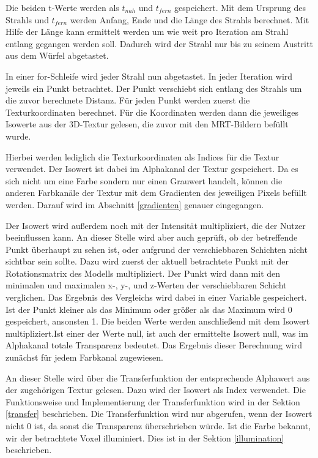 Die beiden t-Werte werden als $t_{nah}$ und $t_{fern}$ gespeichert.
Mit dem Ursprung des Strahls und $t_{fern}$ werden Anfang, Ende und die Länge des Strahls berechnet. Mit Hilfe der Länge kann ermittelt werden um wie weit pro Iteration am Strahl entlang gegangen werden soll. Dadurch wird der Strahl nur bis zu seinem Austritt aus dem Würfel abgetastet. 

In einer for-Schleife wird jeder Strahl nun abgetastet. In jeder Iteration wird jeweils ein Punkt betrachtet. Der Punkt verschiebt sich entlang des Strahls um die zuvor berechnete Distanz.
Für jeden Punkt werden zuerst die Texturkoordinaten berechnet.
Für die Koordinaten werden dann die jeweiliges Isowerte aus der 3D-Textur gelesen, die zuvor mit den MRT-Bildern befüllt wurde.

Hierbei werden lediglich die Texturkoordinaten als Indices für die Textur verwendet. 
Der Isowert ist dabei im Alphakanal der Textur gespeichert. Da es sich nicht um eine Farbe sondern nur einen Grauwert handelt, können die anderen Farbkanäle der Textur mit dem Gradienten des jeweiligen Pixels befüllt werden. Darauf wird im Abschnitt \ref{gradienten} genauer eingegangen.

Der Isowert wird außerdem noch mit der Intensität multipliziert, die der Nutzer beeinflussen kann.
An dieser Stelle wird aber auch geprüft, ob der betreffende Punkt überhaupt zu sehen ist, oder aufgrund der verschiebbaren Schichten nicht sichtbar sein sollte. 
Dazu wird zuerst der aktuell betrachtete Punkt mit der Rotationsmatrix des Modells multipliziert.
Der Punkt wird dann mit den minimalen und maximalen x-, y-, und z-Werten der verschiebbaren Schicht verglichen. Das Ergebnis des Vergleichs wird dabei in einer Variable gespeichert. Ist der Punkt kleiner als das Minimum oder größer als das Maximum wird 0 gespeichert, ansonsten 1. 
Die beiden Werte werden anschließend mit dem Isowert multipliziert.Ist einer der Werte null, ist auch der ermittelte Isowert null, was im Alphakanal totale Transparenz bedeutet. 
Das Ergebnis dieser Berechnung wird zunächst für jedem Farbkanal zugewiesen.

An dieser Stelle wird über die Transferfunktion der entsprechende Alphawert aus der zugehörigen Textur gelesen. Dazu wird der Isowert als Index verwendet. Die Funktionsweise und Implementierung der Transferfunktion wird in der Sektion \ref{transfer} beschrieben.
Die Transferfunktion wird nur abgerufen, wenn der Isowert nicht 0 ist, da sonst die Transparenz überschrieben würde.
Ist die Farbe bekannt, wir der betrachtete Voxel illuminiert. Dies ist in der Sektion \ref{illumination} beschrieben. 

